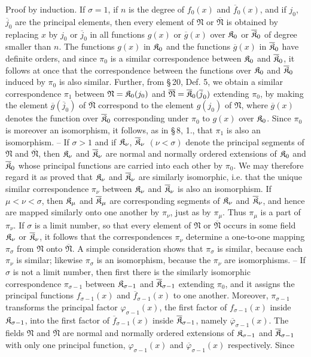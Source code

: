 Proof by induction. If $\sigma=1$, if $n$ is the degree of $f_0(x)$ and $\overline f_0(x)$, and if $j_0$, $\overline j_0$ are the principal elements, then every element of $\mathfrak N$ or $\overline{\mathfrak N}$ is obtained by replacing $x$ by $j_0$ or $\overline j_0$ in all functions $g(x)$ or $\overline g(x)$ over $\mathfrak K_0$ or $\overline{\mathfrak K}_0$ of degree smaller than $n$. The functions $g(x)$ in $\mathfrak K_0$ and the functions $\overline g(x)$ in $\overline{\mathfrak K}_0$ have definite orders, and since $\pi_0$ is a similar correspondence between $\mathfrak K_0$ and $\overline{\mathfrak K}_0$, it follows at once that the correspondence between the functions over $\mathfrak K_0$ and $\overline{\mathfrak K}_0$ induced by $\pi_0$ is also similar. Further, from \S\,20, Def. 5, we obtain a similar correspondence $\pi_1$ between $\mathfrak N=\mathfrak K_0(j_0)$ and $\overline{\mathfrak N}=\overline{\mathfrak K}_0(\overline j_0)$ extending $\pi_0$, by making the element $\overline g(\overline j_0)$ of $\overline{\mathfrak N}$ correspond to the element $g(j_0)$ of $\mathfrak N$, where $\overline g(x)$ denotes the function over $\overline{\mathfrak K}_0$ corresponding under $\pi_0$ to $g(x)$ over $\mathfrak K_0$. Since $\pi_0$ is moreover an isomorphism, it follows, as in \S\,8, 1., that $\pi_1$ is also an isomorphism. -- If $\sigma>1$ and if $\mathfrak K_\nu$, $\overline{\mathfrak K}_\nu$ $(\nu<\sigma)$ denote the principal segments of $\mathfrak N$ and $\overline{\mathfrak N}$, then $\mathfrak K_\nu$ and $\overline{\mathfrak K}_\nu$ are normal and normally ordered extensions of $\mathfrak K_0$ and $\overline{\mathfrak K}_0$ whose principal functions are carried into each other by $\pi_0$. We may therefore regard it as proved that $\mathfrak K_\nu$ and $\overline{\mathfrak K}_\nu$ are similarly isomorphic, i.e. that the unique similar correspondence $\pi_\nu$ between $\mathfrak K_\nu$ and $\overline{\mathfrak K}_\nu$ is also an isomorphism. If $\mu<\nu<\sigma$, then $\mathfrak K_\mu$ and $\overline{\mathfrak K}_\mu$ are corresponding segments of $\mathfrak K_\nu$ and $\overline{\mathfrak K}_\nu$, and hence are mapped similarly onto one another by $\pi_\nu$, just as by $\pi_\mu$. Thus $\pi_\mu$ is a part of $\pi_\nu$. If $\sigma$ is a limit number, so that every element of $\mathfrak N$ or $\overline{\mathfrak N}$ occurs in some field $\mathfrak K_\nu$ or $\overline{\mathfrak K}_\nu$, it follows that the correspondences $\pi_\nu$ determine a one-to-one mapping $\pi_\sigma$ from $\mathfrak N$ onto $\overline{\mathfrak N}$. A simple consideration shows that $\pi_\sigma$ is similar, because each $\pi_\nu$ is similar; likewise $\pi_\sigma$ is an isomorphism, because the $\pi_\nu$ are isomorphisms. -- If $\sigma$ is not a limit number, then first there is the similarly isomorphic correspondence $\pi_{\sigma-1}$ between $\mathfrak K_{\sigma-1}$ and $\overline{\mathfrak K}_{\sigma-1}$ extending $\pi_0$, and it assigns the principal functions $f_{\sigma-1}(x)$ and $\overline f_{\sigma-1}(x)$ to one another. Moreover, $\pi_{\sigma-1}$ transforms the principal factor $\varphi_{\sigma-1}(x)$, the first factor of $f_{\sigma-1}(x)$ inside $\mathfrak K_{\sigma-1}$, into the first factor of $\overline f_{\sigma-1}(x)$ inside $\overline{\mathfrak K}_{\sigma-1}$, namely $\overline\varphi_{\sigma-1}(x)$. The fields $\mathfrak N$ and $\overline{\mathfrak N}$ are normal and normally ordered extensions of $\mathfrak K_{\sigma-1}$ and $\overline{\mathfrak K}_{\sigma-1}$ with only one principal function, $\varphi_{\sigma-1}(x)$ and $\overline\varphi_{\sigma-1}(x)$ respectively. Since 